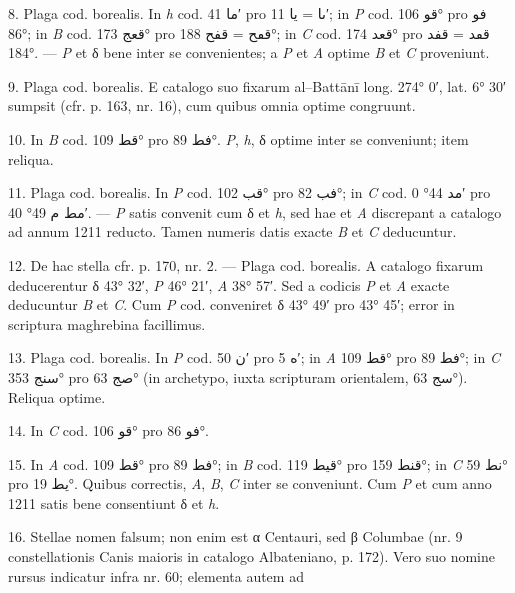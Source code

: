 \documentclass[11pt]{article}
\newcommand{\AbjadZero}{{\NallinoSigns\symbol{"E000}}}
\begin{document}
{\small
\par\hangindent=12mm 8. Plaga cod. borealis. In \textit{h} cod. \textarabic{ما} 41′ pro \textarabic{ٮا} = \textarabic{يا} 11′; in \textit{P} cod. \textarabic{قو} 106° pro \textarabic{فو} 86°; in \textit{B} cod. \textarabic{قعج} 173° pro \textarabic{قڡح} = \textarabic{قفح} 188°; in \textit{C} cod. \textarabic{قعد} 174° pro \textarabic{قڡد} = \textarabic{قفد} 184°. — \textit{P} et δ bene inter se convenientes; a \textit{P} et \textit{A} optime \textit{B} et \textit{C} proveniunt.
\par\hangindent=12mm 9. Plaga cod. borealis. E catalogo suo fixarum al–Battānī long. 274° 0′, lat. 6° 30′ sumpsit (cfr. p. 163, nr. 16), cum quibus omnia optime congruunt.
\par\hangindent=12mm 10. In \textit{B} cod. \textarabic{قط} 109° pro \textarabic{فط} 89°. \textit{P}, \textit{h}, δ optime inter se conveniunt; item reliqua.
\par\hangindent=12mm 11. Plaga cod. borealis. In \textit{P} cod. \textarabic{قب} 102° pro \textarabic{فب} 82°; in \textit{C} cod. \textarabic{مد \AbjadZero{}} 44° 0′ pro \textarabic{مط م} 49° 40′. — \textit{P} satis convenit cum δ et \textit{h}, sed hae et \textit{A} discrepant a catalogo ad annum 1211 reducto. Tamen numeris datis exacte \textit{B} et \textit{C} deducuntur.
\par\hangindent=12mm 12. De hac stella cfr. p. 170, nr. 2. — Plaga cod. borealis. A catalogo fixarum deducerentur δ 43° 32′, \textit{P} 46° 21′, \textit{A} 38° 57′. Sed a codicis \textit{P} et \textit{A} exacte deducuntur \textit{B} et \textit{C}. Cum \textit{P} cod. conveniret δ 43° 49′ pro 43° 45′; error in scriptura maghrebina facillimus.
\par\hangindent=12mm 13. Plaga cod. borealis. In \textit{P} cod. \textarabic{ن} 50′ pro \textarabic{ه} 5′; in \textit{A} \textarabic{قط} 109° pro \textarabic{فط} 89°; in \textit{C} \textarabic{سنج} 353° pro \textarabic{صج} 63° (in archetypo, iuxta scripturam orientalem, \textarabic{سج} 63°). Reliqua optime.
\par\hangindent=12mm 14. In \textit{C} cod. \textarabic{قو} 106° pro \textarabic{فو} 86°.
\par\hangindent=12mm 15. In \textit{A} cod. \textarabic{قط} 109° pro \textarabic{فط} 89°; in \textit{B} cod. \textarabic{قيط} 119° pro \textarabic{قنط} 159°; in \textit{C} \textarabic{نط} 59° pro \textarabic{يط} 19°. Quibus correctis, \textit{A}, \textit{B}, \textit{C} inter se conveniunt. Cum \textit{P} et cum anno 1211 satis bene consentiunt δ et \textit{h}.
\par\hangindent=12mm 16. Stellae nomen falsum; non enim est α Centauri, sed β Columbae (nr. 9 constellationis Canis maioris in catalogo Albateniano, p. 172). Vero suo nomine rursus indicatur infra nr. 60; elementa autem ad
\par}
\end{document}

